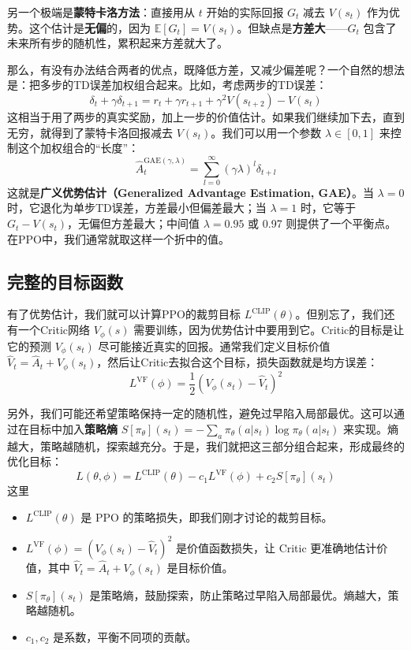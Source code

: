 \documentclass[lang=cn,zihao=-4,a4paper,fontset=windows]{beautybook}
\begin{document}
另一个极端是\textbf{蒙特卡洛方法}：直接用从 \(t\) 开始的实际回报 \(G_t\) 减去 \(V(s_t)\) 作为优势。这个估计是\textbf{无偏}的，因为 \(\mathbb{E}[G_t] = V(s_t)\)。但缺点是\textbf{方差大}——\(G_t\) 包含了未来所有步的随机性，累积起来方差就大了。

那么，有没有办法结合两者的优点，既降低方差，又减少偏差呢？一个自然的想法是：把多步的TD误差加权组合起来。比如，考虑两步的TD误差：
\[
\delta_t + \gamma \delta_{t+1} = r_t + \gamma r_{t+1} + \gamma^2 V(s_{t+2}) - V(s_t)
\]
这相当于用了两步的真实奖励，加上一步的价值估计。如果我们继续加下去，直到无穷，就得到了蒙特卡洛回报减去 \(V(s_t)\)。我们可以用一个参数 \(\lambda \in [0,1]\) 来控制这个加权组合的“长度”：
\[
\hat{A}_t^{\text{GAE}(\gamma,\lambda)} = \sum_{l=0}^{\infty} (\gamma \lambda)^l \delta_{t+l}
\]
这就是\textbf{广义优势估计（Generalized Advantage Estimation, GAE）}。当 \(\lambda = 0\) 时，它退化为单步TD误差，方差最小但偏差最大；当 \(\lambda = 1\) 时，它等于 \(G_t - V(s_t)\)，无偏但方差最大；中间值 \(\lambda = 0.95\) 或 0.97 则提供了一个平衡点。在PPO中，我们通常就取这样一个折中的值。

\subsection{完整的目标函数}

有了优势估计，我们就可以计算PPO的裁剪目标 \(L^{\text{CLIP}}(\theta)\)。但别忘了，我们还有一个Critic网络 \(V_\phi(s)\) 需要训练，因为优势估计中要用到它。Critic的目标是让它的预测 \(V_\phi(s_t)\) 尽可能接近真实的回报。通常我们定义目标价值 \(\hat{V}_t = \hat{A}_t + V_\phi(s_t)\)，然后让Critic去拟合这个目标，损失函数就是均方误差：
\[
L^{\text{VF}}(\phi) = \frac{1}{2} \left( V_\phi(s_t) - \hat{V}_t \right)^2
\]

另外，我们可能还希望策略保持一定的随机性，避免过早陷入局部最优。这可以通过在目标中加入\textbf{策略熵} \(S[\pi_\theta](s_t) = -\sum_a \pi_\theta(a|s_t) \log \pi_\theta(a|s_t)\) 来实现。熵越大，策略越随机，探索越充分。于是，我们就把这三部分组合起来，形成最终的优化目标：
\[
L(\theta, \phi) = L^{\text{CLIP}}(\theta) - c_1 L^{\text{VF}}(\phi) + c_2 S[\pi_\theta](s_t)
\]
这里 
\begin{itemize}
    \item \(L^{\text{CLIP}}(\theta)\) 是 PPO 的策略损失，即我们刚才讨论的裁剪目标。
    \item \(L^{\text{VF}}(\phi) = (V_\phi(s_t) - \hat{V}_t)^2\) 是价值函数损失，让 Critic 更准确地估计价值，其中 \(\hat{V}_t = \hat{A}_t + V_\phi(s_t)\) 是目标价值。
    \item \(S[\pi_\theta](s_t)\) 是策略熵，鼓励探索，防止策略过早陷入局部最优。熵越大，策略越随机。
    \item \(c_1, c_2\) 是系数，平衡不同项的贡献。
\end{itemize}
\end{document}
